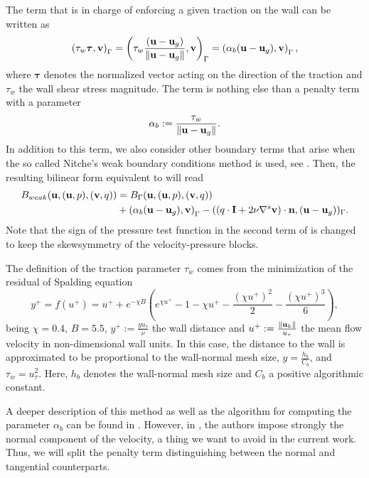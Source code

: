 The term that is in charge of enforcing a given traction on the wall can be written as
\begin{equation}
\label{eq-C7_wall_term}
\left(\tau_w\boldsymbol{\tau},{\bf v}\right)_\Gamma=\left(\tau_w\frac{({\bf u}-{\bf u}_g)}{\|{\bf u}-{\bf u}_g\|},{\bf v}\right)_\Gamma=\left(\alpha_b({\bf u}-{\bf u}_g),{\bf v}\right)_\Gamma,
\end{equation}
where $ \boldsymbol{\tau} $ denotes the normalized vector acting on the direction of the traction and $ \tau_w $ the wall shear stress magnitude. The term  is nothing else than a penalty term with a parameter \begin{equation}
\label{eq-C7_alpha_b}
\alpha_b:=\frac{\tau_w}{\|{\bf u}-{\bf u}_g\|}.
\end{equation}
In addition to this term, we also consider other boundary terms that arise when the so called Nitche's weak boundary conditions method is used, see \cite{Nitsche,Stenberg}. Then, the resulting bilinear form equivalent to  will read
\begin{align}
\label{eq-C7_bilinear_weak}
B_{weak}({\bf u},({\bf u},p),({\bf v},q))&=B_\Gamma({\bf u},({\bf u},p),({\bf v},q))\\\nonumber
&+\left(\alpha_b({\bf u}-{\bf u}_g),{\bf v}\right)_\Gamma-((q\cdot\mathbf{I}+2\nu\nabla^s{\bf v})\cdot{\bf n},({\bf u}-{\bf u}_g))_\Gamma.
\end{align}
Note that the sign of the pressure test function in the second term of  is changed to keep the skewsymmetry of the velocity-pressure blocks. 

The definition of the traction parameter $ \tau_w $ comes from the minimization of the residual of Spalding equation
\begin{equation}
\label{eq-C7_spalding}
y^+=f(u^+)=u^++e^{-\chi B}\left(e^{\chi u^+}-1-\chi u^+-\frac{\left(\chi u^+\right)^2}{2}-\frac{\left(\chi u^+\right)^3}{6}\right),
\end{equation}
being $ \chi=0.4 $, $ B=5.5 $, $ y^+:=\frac{yu_\tau}{\nu} $ the wall distance and $ u^+:=\frac{\|{\bf u}_h\|}{u_\tau} $ the mean flow velocity in non-dimensional wall units. In this case, the distance to the wall is approximated to be proportional to the wall-normal mesh size, $ y=\frac{h_b}{C_b} $, and $ \tau_w=u_\tau^2 $. Here, $ h_b $ denotes the wall-normal mesh size and $ C_b $ a positive algorithmic constant.

A deeper description of this method as well as the algorithm for computing the parameter $\alpha_b$ can be found in \cite{bazilevs...}. However, in \cite{bazilevs...}, the authors impose strongly the normal component of the velocity, a thing we want to avoid in the current work. Thus, we will split the penalty term distinguishing between the normal and tangential counterparts. 

